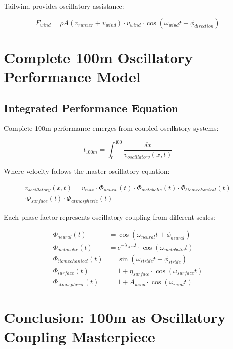 \documentclass[12pt]{article}
\begin{document}
Tailwind provides oscillatory assistance:

\begin{equation}
F_{wind} = \rho A (v_{runner} + v_{wind}) \cdot v_{wind} \cdot \cos(\omega_{wind}t + \phi_{direction})
\end{equation}

\section{Complete 100m Oscillatory Performance Model}

\subsection{Integrated Performance Equation}

Complete 100m performance emerges from coupled oscillatory systems:

\begin{equation}
t_{100m} = \int_0^{100} \frac{dx}{v_{oscillatory}(x,t)}
\end{equation}

Where velocity follows the master oscillatory equation:

\begin{multline}
v_{oscillatory}(x,t) = v_{max} \cdot \Phi_{neural}(t) \cdot \Phi_{metabolic}(t) \cdot \Phi_{biomechanical}(t) \\
\cdot \Phi_{surface}(t) \cdot \Phi_{atmospheric}(t)
\end{multline}

Each phase factor represents oscillatory coupling from different scales:

\begin{align}
\Phi_{neural}(t) &= \cos(\omega_{neural}t + \phi_{neural}) \\
\Phi_{metabolic}(t) &= e^{-\lambda_{ATP}t} \cdot \cos(\omega_{metabolic}t) \\
\Phi_{biomechanical}(t) &= \sin(\omega_{stride}t + \phi_{stride}) \\
\Phi_{surface}(t) &= 1 + \eta_{surface} \cdot \cos(\omega_{surface}t) \\
\Phi_{atmospheric}(t) &= 1 + A_{wind} \cdot \cos(\omega_{wind}t)
\end{align}

\section{Conclusion: 100m as Oscillatory Coupling Masterpiece}
\end{document}
